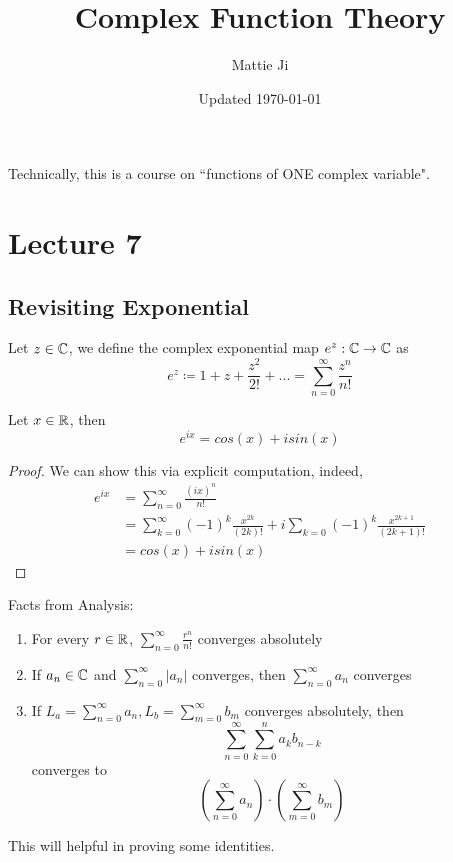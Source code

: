\documentclass{article}
\title{Complex Function Theory}
\author{Mattie Ji}
\date{Updated \today}
\begin{document}
\maketitle

\noindent Technically, this is a course on ``functions of ONE complex variable".
\tableofcontents
\newpage









\newpage
\section{Lecture 7}

\subsection{Revisiting Exponential}

\begin{definition}
    Let $z \in \mathbb{C}$, we define the complex exponential map $e^z: \mathbb{C} \to \mathbb{C}$ as
    \[e^z \coloneqq 1 + z + \frac{z^2}{2!} + ... = \sum_{n = 0}^\infty \frac{z^n}{n!}\]
\end{definition}

\begin{theorem}
Let $x \in \mathbb{R}$, then
\[e^{ix} = cos(x) + i sin(x)\]
\end{theorem}

\begin{proof}
We can show this via explicit computation, indeed,
\begin{align*}
    e^{ix} &= \sum_{n = 0}^\infty \frac{(ix)^n}{n!}\\
    &= \sum_{k = 0}^\infty (-1)^k \frac{x^{2k}}{(2k)!} + i \sum_{k = 0} (-1)^k \frac{x^{2k + 1}}{(2k + 1)!} \tag*{Separate even and odd degree terms}\\
    &= cos(x) + i sin(x) \tag*{Taylor Series}
\end{align*}
\end{proof}

\begin{lemma}\label{lem::real_analy_fact}
Facts from Analysis:
\begin{enumerate}
    \item For every $r \in \mathbb{R}$, $\sum_{n = 0}^\infty \frac{r^n}{n!}$ converges absolutely
    \item If $a_n \in \mathbb{C}$ and $\sum_{n = 0}^\infty |a_n|$ converges, then $\sum_{n = 0}^\infty a_n$ converges
    \item If $L_a = \sum_{n = 0}^\infty a_n, L_b = \sum_{m = 0}^\infty b_m$ converges absolutely, then
    \[\sum_{n = 0}^\infty \sum_{k = 0}^n a_k b_{n - k}\]
    converges to
    \[(\sum_{n = 0}^\infty a_n) \cdot (\sum_{m = 0}^\infty b_m)\]
\end{enumerate}
This will helpful in proving some identities.
\end{lemma}
\end{document}
